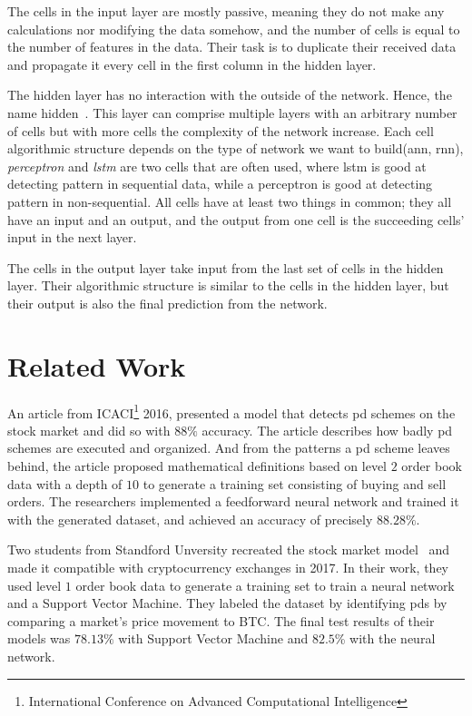 The cells in the input layer are mostly passive, meaning they do not make any calculations nor modifying the data somehow, and the number of cells is equal to the number of features in the data. Their task is to duplicate their received data and propagate it every cell in the first column in the hidden layer.

The hidden layer has no interaction with the outside of the network. Hence, the name hidden~\cite{data_science, stanford}. This layer can comprise multiple layers with an arbitrary number of cells but with more cells the complexity of the network increase. Each cell algorithmic structure depends on the type of network we want to build(\ac{ann}, \ac{rnn}), \emph{perceptron} and \emph{lstm} are two cells that are often used, where \ac{lstm} is good at detecting pattern in sequential data, while a perceptron is good at detecting pattern in non-sequential. All cells have at least two things in common; they all have an input and an output, and the output from one cell is the succeeding cells' input in the next layer. 

The cells in the output layer take input from the last set of cells in the hidden layer. Their algorithmic structure is similar to the cells in the hidden layer, but their output is also the final prediction from the network.

\newpage
\section{Related Work}\label{sec:related_work}
An article from ICACI\footnote{International Conference on Advanced Computational Intelligence} 2016, \cite{P&D_stock_price_manipulation} presented a model that detects \ac{pd} schemes on the stock market and did so with $88\%$ accuracy. The article describes how badly \ac{pd} schemes are executed and organized. And from the patterns a \ac{pd} scheme leaves behind, the article proposed mathematical definitions based on level $2$ order book data with a depth of $10$ to generate a training set consisting of buying and sell orders. The researchers implemented a feedforward neural network and trained it with the generated dataset, and achieved an accuracy of precisely $88.28\%$.

Two students from Standford Unversity recreated the stock market model~\cite{P&D_stock_price_manipulation} and made it compatible with cryptocurrency exchanges in 2017. In their work, they used level $1$ order book data to generate a training set to train a neural network and a Support Vector Machine. They labeled the dataset by identifying \acp{pd} by comparing a market's price movement to BTC. The final test results of their models was $78.13\%$ with Support Vector Machine and $82.5$\% with the neural network. 

